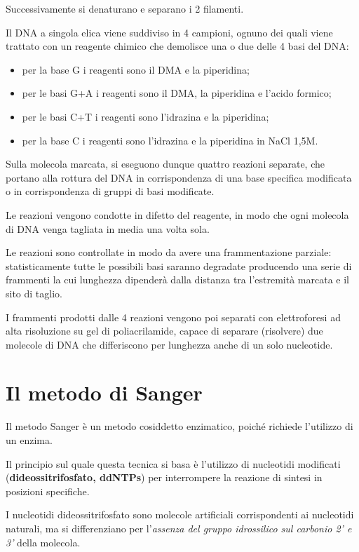 \documentclass[11pt]{book}
\begin{document}
Successivamente si denaturano e separano i 2 filamenti.

Il DNA a singola elica viene suddiviso in 4 campioni, ognuno dei quali
viene trattato con un reagente chimico che demolisce una o due delle 4
basi del DNA:

\begin{itemize}
\itemsep1pt\parskip0pt
\item
  per la base G i reagenti sono il DMA e la piperidina;
\item
  per le basi G+A i reagenti sono il DMA, la piperidina e l'acido
  formico;
\item
  per le basi C+T i reagenti sono l'idrazina e la piperidina;
\item
  per la base C i reagenti sono l'idrazina e la piperidina in NaCl 1,5M.
\end{itemize}

Sulla molecola marcata, si eseguono dunque quattro reazioni separate,
che portano alla rottura del DNA in corrispondenza di una base specifica
modificata o in corrispondenza di gruppi di basi modificate.

Le reazioni vengono condotte in difetto del reagente, in modo che ogni
molecola di DNA venga tagliata in media una volta sola.

Le reazioni sono controllate in modo da avere una frammentazione
parziale: statisticamente tutte le possibili basi saranno degradate
producendo una serie di frammenti la cui lunghezza dipenderà dalla
distanza tra l'estremità marcata e il sito di taglio.

I frammenti prodotti dalle 4 reazioni vengono poi separati con
elettroforesi ad alta risoluzione su gel di poliacrilamide, capace di
separare (risolvere) due molecole di DNA che differiscono per lunghezza
anche di un solo nucleotide.

\section{Il metodo di Sanger}\label{il-metodo-di-sanger}

Il metodo Sanger è un metodo cosiddetto enzimatico, poiché richiede
l'utilizzo di un enzima.

Il principio sul quale questa tecnica si basa è l'utilizzo di nucleotidi
modificati (\textbf{dideossitrifosfato, ddNTPs}) per interrompere la
reazione di sintesi in posizioni specifiche.

I nucleotidi dideossitrifosfato sono molecole artificiali corrispondenti
ai nucleotidi naturali, ma si differenziano per l'\emph{assenza del
gruppo idrossilico sul carbonio 2' e 3'} della molecola.
\end{document}
